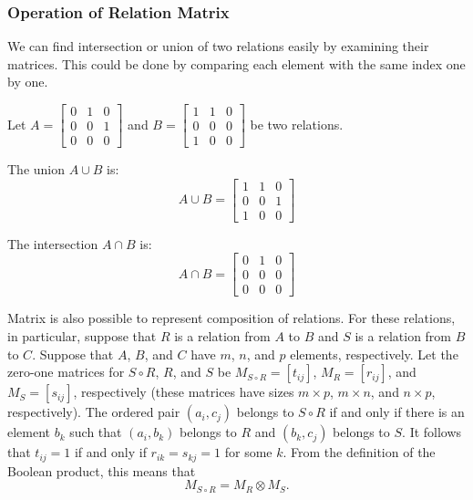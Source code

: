 	\subsubsection*{Operation of Relation Matrix}
	We can find intersection or union of two relations easily by examining their matrices. This could be done by comparing each element with the same index one by one.
	\begin{example}
		Let \( A = \begin{bmatrix} 0 & 1 & 0 \\ 0 & 0 & 1 \\ 0 & 0 & 0 \end{bmatrix} \) and \( B = \begin{bmatrix} 1 & 1 & 0 \\ 0 & 0 & 0 \\ 1 & 0 & 0 \end{bmatrix} \) be two relations.
		
		The union \( A \cup B \) is:
		$$ A \cup B = \begin{bmatrix} 1 & 1 & 0 \\ 0 & 0 & 1 \\ 1 & 0 & 0 \end{bmatrix} $$
		
		The intersection \( A \cap B \) is:
		$$ A \cap B = \begin{bmatrix} 0 & 1 & 0 \\ 0 & 0 & 0 \\ 0 & 0 & 0 \end{bmatrix} $$
	\end{example}
	Matrix is also possible to represent composition of relations. For these relations, in particular, suppose that \( R \) is a relation from \( A \) to \( B \) and \( S \) is a relation from \( B \) to \( C \). Suppose that \( A \), \( B \), and \( C \) have \( m \), \( n \), and \( p \) elements, respectively. Let the zero-one matrices for \( S \circ R \), \( R \), and \( S \) be \( M_{S \circ R} = [t_{ij}] \), \( M_R = [r_{ij}] \), and \( M_S = [s_{ij}] \), respectively (these matrices have sizes \( m \times p \), \( m \times n \), and \( n \times p \), respectively). The ordered pair \( (a_i, c_j) \) belongs to \( S \circ R \) if and only if there is an element \( b_k \) such that \( (a_i, b_k) \) belongs to \( R \) and \( (b_k, c_j) \) belongs to \( S \). It follows that \( t_{ij} = 1 \) if and only if \( r_{ik} = s_{kj} = 1 \) for some \( k \). From the definition of the Boolean product, this means that
	$$ M_{S \circ R} = M_R \otimes M_S. $$
